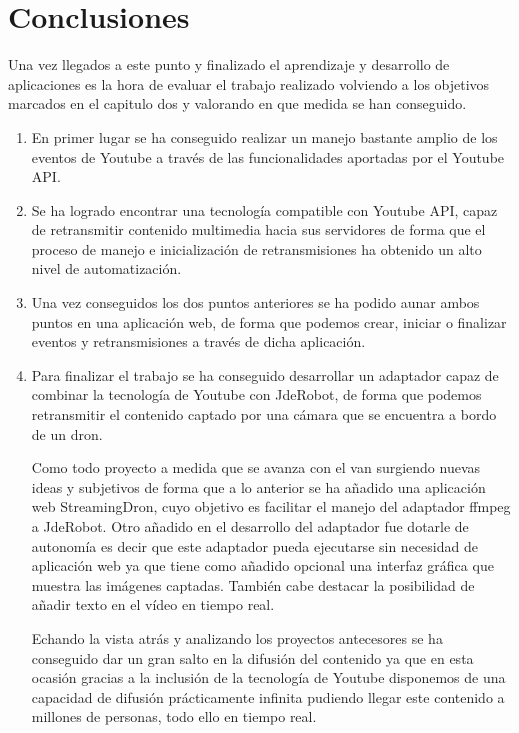 \chapter{Conclusiones}

Una vez llegados a este punto y finalizado el aprendizaje y desarrollo de aplicaciones es la hora de evaluar el trabajo realizado volviendo a los objetivos marcados en el capitulo dos y valorando en que medida se han conseguido.

\begin{enumerate}
    \item En primer lugar se ha conseguido realizar un manejo bastante amplio de los eventos de Youtube a través de las funcionalidades aportadas por el Youtube API.
    \item Se ha logrado encontrar una tecnología compatible con Youtube API, capaz de retransmitir contenido multimedia hacia sus servidores de forma que el proceso de manejo e inicialización de retransmisiones ha obtenido un alto nivel de automatización.
    \item Una vez conseguidos los dos puntos anteriores se ha podido aunar ambos puntos en una aplicación web, de forma que podemos crear, iniciar o finalizar eventos y retransmisiones a través de dicha aplicación.
    \item Para finalizar el trabajo se ha conseguido desarrollar un adaptador capaz de combinar la tecnología de Youtube con JdeRobot, de forma que podemos retransmitir el contenido captado por una cámara que se encuentra a bordo de un dron.
    
    Como todo proyecto a medida que se avanza con el van surgiendo nuevas ideas y subjetivos de forma que a lo anterior se ha añadido una aplicación web StreamingDron, cuyo objetivo es facilitar el manejo del adaptador ffmpeg a JdeRobot. Otro añadido en el desarrollo del adaptador fue dotarle de autonomía es decir que este adaptador pueda ejecutarse sin necesidad de aplicación web ya que tiene como añadido opcional una interfaz gráfica que muestra las imágenes captadas. También cabe destacar la posibilidad de añadir texto en el vídeo en tiempo real.
    
    Echando la vista atrás y analizando los proyectos antecesores se ha conseguido dar un gran salto en la difusión del contenido ya que en esta ocasión gracias a la inclusión de la tecnología de Youtube disponemos de una capacidad de difusión prácticamente infinita pudiendo llegar este contenido a millones de personas, todo ello en tiempo real.
    

\end{enumerate}
